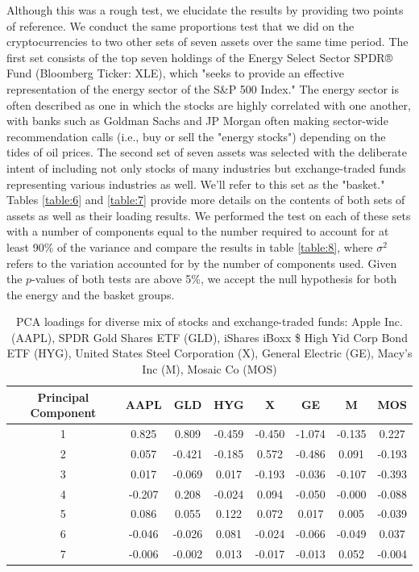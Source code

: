\documentclass[12pt,twoside]{article}
\newcommand{\head}[1]{\textnormal{\textbf{#1}}}
\begin{document}
\bigbreak
Although this was a rough test, we elucidate the results by providing two points of reference. We conduct the same proportions test that we did on the cryptocurrencies to two other sets of seven assets over the same time period. The first set consists of the top seven holdings of the Energy Select Sector SPDR® Fund (Bloomberg Ticker: XLE), which "seeks to provide an effective representation of the energy sector of the S\&P 500 Index." The energy sector is often described as one in which the stocks are highly correlated with one another, with banks such as Goldman Sachs and JP Morgan often making sector-wide recommendation calls (i.e., buy or sell the "energy stocks") depending on the tides of oil prices. The second set of seven assets was selected with the deliberate intent of including not only stocks of many industries but exchange-traded funds representing various industries as well. We'll refer to this set as the "basket." Tables \ref{table:6} and \ref{table:7} provide more details on the contents of both sets of assets as well as their loading results. We performed the test on each of these sets with a number of components equal to the number required to account for at least 90\% of the variance and compare the results in table \ref{table:8}, where $\sigma^2$ refers to the variation accounted for by the number of components used. Given the $p$-values of both tests are above 5\%, we accept the null hypothesis for both the energy and the basket groups.

\begin{table}[h!]
	\centering
	\begin{tabular}{cccccccc}
		\toprule
		\head{Principal Component} & \head{AAPL} & \head{GLD} & \head{HYG} &      \head{X} & \head{GE} & \head{M} & \head{MOS} \\
		\midrule
		1         &  0.825 &  0.809 & -0.459 & -0.450 & -1.074 & -0.135 &  0.227 \\
		2         &  0.057 & -0.421 & -0.185 &  0.572 & -0.486 &  0.091 & -0.193 \\
		3         &  0.017 & -0.069 &  0.017 & -0.193 & -0.036 & -0.107 & -0.393 \\
		4         & -0.207 &  0.208 & -0.024 &  0.094 & -0.050 & -0.000 & -0.088 \\
		5         &  0.086 &  0.055 &  0.122 &  0.072 &  0.017 &  0.005 & -0.039 \\
		6         & -0.046 & -0.026 &  0.081 & -0.024 & -0.066 & -0.049 &  0.037 \\
		7         & -0.006 & -0.002 &  0.013 & -0.017 & -0.013 &  0.052 & -0.004 \\
		\bottomrule
	\end{tabular}
	\caption{PCA loadings for diverse mix of stocks and exchange-traded funds: Apple Inc. (AAPL), SPDR Gold Shares ETF (GLD),  iShares iBoxx \$ High Yid Corp Bond ETF (HYG), United States Steel Corporation (X), General Electric (GE), Macy's Inc (M), Mosaic Co (MOS) }
	\label{table:5}
\end{table}
\end{document}
